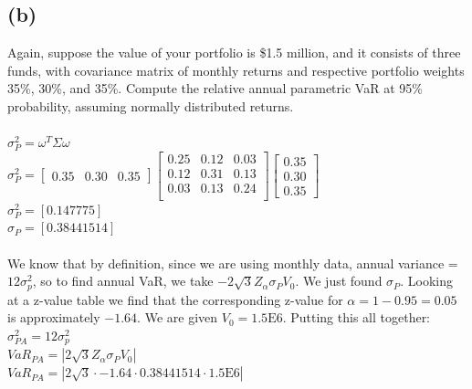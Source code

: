 \documentclass{article}
\begin{document}
{\subsection*{(b)}

Again, suppose the value of your portfolio is \$1.5 million, and it consists of three funds, with covariance matrix of monthly returns and respective portfolio weights 35\%, 30\%, and 35\%. Compute the relative annual parametric VaR at 95\% probability, assuming normally distributed returns. \\ \\

$\sigma_P^2 = \omega^T \Sigma \omega$ \\
$\sigma_P^2 = 
\begin{bmatrix}
  0.35 & 0.30 & 0.35
\end{bmatrix}
\begin{bmatrix}
  0.25 & 0.12 & 0.03 \\
  0.12 & 0.31 & 0.13 \\
  0.03 & 0.13 & 0.24 \\
\end{bmatrix}
\begin{bmatrix}
  0.35 \\
  0.30 \\
  0.35
\end{bmatrix}$ \\
$\sigma_P^2 = [0.147775]$ \\
$\sigma_P = [0.38441514]$ \\ \\
We know that by definition, since we are using monthly data, annual variance = $12 \sigma_p^2$, so to find annual VaR, we take $-2\sqrt{3}Z_\alpha \sigma_P V_0$. We just found $\sigma_P$. Looking at a z-value table we find that the corresponding z-value for $\alpha = 1 - 0.95 = 0.05$ is approximately $-1.64$. We are given $V_0 = 1.5\text{E6}$. Putting this all together: \\
$\sigma_{PA}^2 = 12 \sigma_p^2$ \\
$VaR_{PA} = |2\sqrt{3} Z_\alpha \sigma_P V_0|$ \\
$VaR_{PA} = |2\sqrt{3} \cdot -1.64 \cdot 0.38441514 \cdot 1.5\text{E6}|$ \\

}
\end{document}
